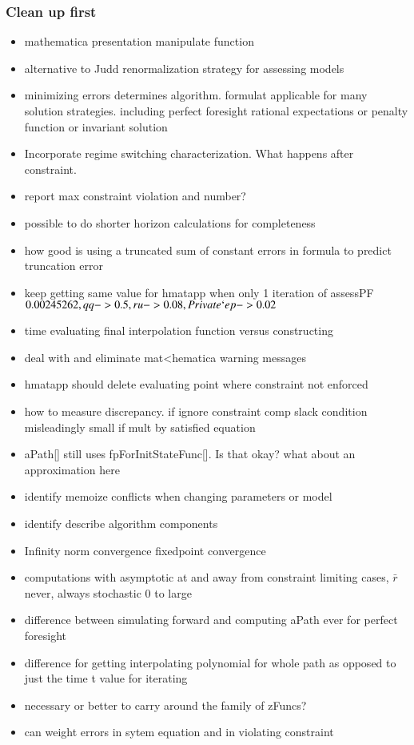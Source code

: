 \documentclass{beamer}
\begin{document}
   \begin{frame}
     \frametitle{Clean up first}
     \begin{itemize}
     \item mathematica presentation manipulate function
     \item alternative to Judd renormalization strategy for assessing models
     \item minimizing errors determines algorithm. formulat applicable for many solution strategies.  including perfect foresight rational expectations or penalty function or invariant solution
     \item Incorporate regime switching characterization.  What happens after constraint.
     \item report max constraint violation and number?
     \item possible to do shorter horizon calculations for completeness
     \item how good is using a truncated sum of constant errors in formula to predict truncation error
     \item keep getting same value for hmatapp when only 1 iteration of assessPF$0.00245262, {qq -> 0.5, ru -> 0.08, Private`ep -> 0.02}$
     \item time evaluating final interpolation function versus constructing
     \item deal with and eliminate mat<hematica warning messages
       \item hmatapp should delete evaluating point where constraint not enforced
       \item how to measure discrepancy.  if ignore constraint comp slack condition misleadingly small if mult by satisfied equation
     \item aPath[] still uses fpForInitStateFunc[].  Is that okay? what about an approximation here
     \item identify memoize conflicts when changing parameters or model
\item identify describe algorithm components
     \item Infinity norm convergence fixedpoint convergence
\item computations with asymptotic at and away from constraint limiting cases, $\bar{r}$ never, always  stochastic 0 to large
\item difference between simulating forward and computing aPath ever for perfect foresight
\item difference for getting interpolating polynomial for whole path as opposed to just the time t value for iterating
\item necessary or better to carry around the family of zFuncs?
\item can weight errors in sytem equation and in violating constraint
     \end{itemize}
   \end{frame}
\end{document}
